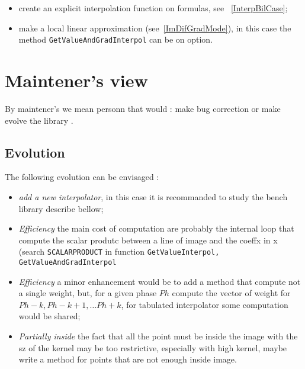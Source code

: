 \begin{itemize}
     \item  create an explicit interpolation function on formulas, see ~\ref{InterpBilCase};
     \item  make a local linear approximation (see~\ref{ImDifGradMode}), in this case the
            method {\tt GetValueAndGradInterpol} can be on option.
\end{itemize}


\section{Maintener's view}

By maintener's we mean personn that would : make bug correction or make evolve the library .

\label{InterpolMaintener}


\subsection{Evolution}

The following evolution can be envisaged :

\begin{itemize}
    \item \emph{add a new interpolator}, in this case it is recommanded to study the bench library describe
	    bellow;
    \item \emph{Efficiency} the main cost of computation are probably the internal loop  that compute
	    the  scalar produtc between a line of  image and the coeffx in x (search {\tt SCALARPRODUCT}
		in function {\tt GetValueInterpol, GetValueAndGradInterpol}

    \item \emph{Efficiency} a minor enhancement would be to add a method that compute not a single
	   weight, but, for a given phase $Ph$ compute the vector of weight for $Ph-k,Ph-k+1,\dots Ph+k$,
           for tabulated interpolator some computation would be shared;

   \item \emph{Partially inside} the fact that all the point must be inside the image with the sz of the kernel
	   may be too restrictive, especially with high kernel, maybe write a method for points that are not
		enough inside image.
\end{itemize}

